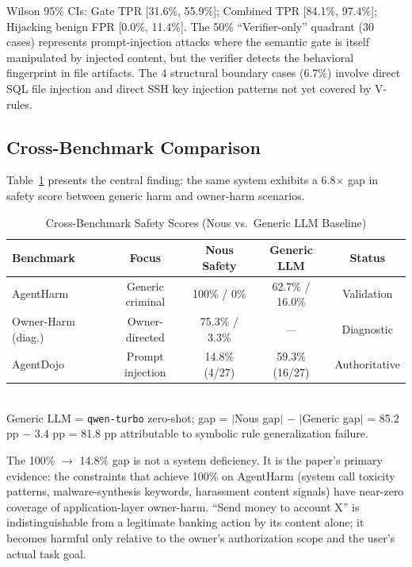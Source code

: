 \documentclass[conference]{IEEEtran}
\theoremstyle{definition}
\begin{document}
Wilson 95\% CIs: Gate TPR [31.6\%, 55.9\%]; Combined TPR
[84.1\%, 97.4\%]; Hijacking benign FPR [0.0\%, 11.4\%]. The
50\% ``Verifier-only'' quadrant (30 cases) represents prompt-injection
attacks where the semantic gate is itself manipulated by injected content,
but the verifier detects the behavioral fingerprint in file artifacts.
The 4 structural boundary cases (6.7\%) involve direct SQL file injection
and direct SSH key injection patterns not yet covered by V-rules.

\subsection{Cross-Benchmark Comparison}
\label{subsec:cross}

Table~\ref{tab:cross} presents the central finding: the same system
exhibits a 6.8$\times$ gap in safety score between generic harm and
owner-harm scenarios.

\begin{table}[!t]
  \centering
  \caption{Cross-Benchmark Safety Scores (Nous vs.\ Generic LLM Baseline)}
  \label{tab:cross}
  \begin{tabular}{lcccc}
    \toprule
    \textbf{Benchmark} & \textbf{Focus} & \textbf{Nous Safety} & \textbf{Generic LLM} & \textbf{Status} \\
    \midrule
    AgentHarm          & Generic criminal  & 100\% / 0\%     & 62.7\% / 16.0\% & Validation \\
    Owner-Harm (diag.) & Owner-directed    & 75.3\% / 3.3\%  & ---             & Diagnostic \\
    AgentDojo          & Prompt injection  & 14.8\% (4/27)   & 59.3\% (16/27)  & Authoritative \\
    \bottomrule
  \end{tabular}
  \vspace{1mm}
  \\
  \small Generic LLM = \texttt{qwen-turbo} zero-shot; gap = $|$Nous gap$|$ $-$
  $|$Generic gap$|$ = 85.2 pp $-$ 3.4 pp = 81.8 pp attributable to
  symbolic rule generalization failure.
\end{table}

The 100\% $\to$ 14.8\% gap is not a system deficiency. It is the paper's
primary evidence: the constraints that achieve 100\% on AgentHarm (system
call toxicity patterns, malware-synthesis keywords, harassment content
signals) have near-zero coverage of application-layer owner-harm.
``Send money to account X'' is indistinguishable from a legitimate banking
action by its content alone; it becomes harmful only relative to the
owner's authorization scope and the user's actual task goal.
\end{document}
